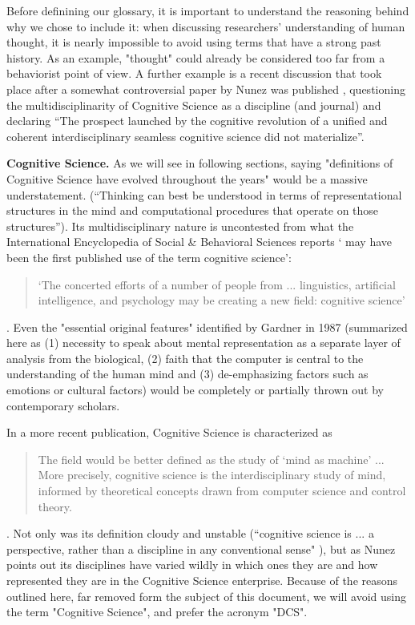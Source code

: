 \documentclass[../main.tex]{subfiles}
\begin{document}
Before definining our glossary, it is important to understand the reasoning behind why we chose to include it: when discussing researchers' understanding of human thought, it is nearly impossible to avoid using terms that have a strong past history. As an example, "thought" could already be considered too far from a behaviorist point of view. A further example is a recent discussion that took place after a somewhat controversial paper by Nunez was published \cite{nunezWhatHappenedCognitive2019}, questioning the multidisciplinarity of Cognitive Science as a discipline (and journal) and declaring \enquote{The prospect launched by the cognitive revolution of a unified and coherent interdisciplinary seamless cognitive science did not materialize}.


\vspace{5pt}
\textbf{Cognitive Science.} As we will see in following sections, saying "definitions of Cognitive Science have evolved throughout the years" would be a massive understatement. (“Thinking can best be understood in terms of representational structures in the mind and computational procedures that operate on those structures”). Its multidisciplinary nature is uncontested from what the International Encyclopedia of Social & Behavioral Sciences \cite{InternationalEncyclopediaSocial} reports \enquote*{ may have been the first published use of the term cognitive science}:
\begin{quote}
    ‘The concerted efforts of a number of people from ... linguistics, artificial intelligence, and psychology may be creating a new field: cognitive science’
\end{quote}. Even the "essential original features" identified by Gardner in 1987 \cite{gardnerMindNewScience1987} (summarized here as (1) necessity to speak about mental representation as a separate layer of analysis from the biological, (2) faith that the computer is central to the understanding of the human mind and (3) de-emphasizing factors such as emotions or cultural factors) would be completely or partially thrown out by contemporary scholars.

In a more recent publication, Cognitive Science is characterized as
\begin{quote}
    The field would be better defined as the study of ‘mind as machine’ ... More precisely, cognitive science is the interdisciplinary study of mind, informed by theoretical concepts drawn from computer science and control theory.
\end{quote}\cite{bodenMindMachineHistory2008}. Not only was its definition cloudy and unstable (“cognitive science is ... a perspective, rather than a discipline in any conventional sense" \cite{sheehyCognitiveScience1995}), but as Nunez points out its disciplines have varied wildly in which ones they are and how represented they are in the Cognitive Science enterprise. Because of the reasons outlined here, far removed form the subject of this document, we will avoid using the term "Cognitive Science", and prefer the acronym "DCS".
\end{document}

